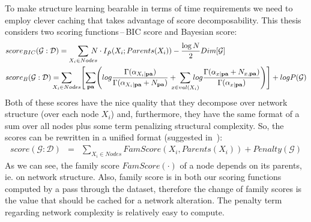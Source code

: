 \documentclass[english,cover]{fitthesis} %
\newcommand{\vars}[1]{{\bold{#1}}}         %
\begin{document}
To make structure learning bearable in terms of time requirements we need to employ clever caching that takes advantage of score decomposability. This thesis considers two scoring functions\,--\,BIC score and Bayesian score:
\begin{equation*}
    \begin{aligned}
    & score_{BIC}(\mathcal{G} : \mathcal{D})
     =  \sum_{X_i \in Nodes} \!\!\!\!\!\! N \cdot I_{\hat P}(X_i;Parents(X_i))
    - \frac{\log N}{2} Dim[\mathcal{G}]\\
    & score_B(\mathcal{G} : \mathcal{D})
     = 
      \!\!\!\!\!\!\! \sum_{X_i \in Nodes}
             \Biggl[
                \sum_{\vars{pa}}
                   \Biggl(
                      log \frac{\Gamma(\alpha_{X_i \mid \vars{pa}})}{\Gamma(\alpha_{X_i \mid \vars{pa}} + N_{\vars{pa}})}
                      + \!\!\!\!\! \sum_{x \in val(X_i)} \!\!\!\!\!\! log \frac{\Gamma(\alpha_{x \mid \vars{pa}} + N_{x, \vars{pa}})}{\Gamma(\alpha_{x \mid \vars{pa}})}
                   \Biggr)
             \Biggr]
      + log P(\mathcal{G})
      \end{aligned}
\end{equation*}
Both of these scores have the nice quality that they decompose over network structure (over each node $X_i$) and, furthermore, they have the same format of a sum over all nodes plus some term penalizing structural complexity. So, the scores can be rewritten in a unified format (suggested in~\cite[p.~818]{pgm}):
\begin{eqnarray*}
    score(\mathcal{G} : \mathcal{D})
    & = & \sum_{X_i \in Nodes} \!\!\!\!\!\! FamScore(X_i, Parents(X_i))
    + Penalty(\mathcal{G})
\end{eqnarray*}
As we can see, the family score $FamScore(\cdot)$ of a node depends on its parents, ie. on network structure. Also, family score is in both our scoring functions computed by a pass through the dataset, therefore the change of family scores is the value that should be cached for a network alteration. The penalty term regarding network complexity is relatively easy to compute.
\end{document}
